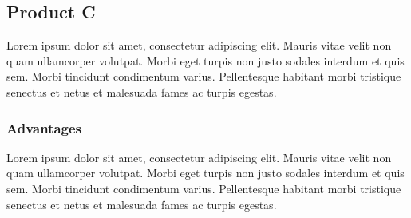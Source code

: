 \documentclass[11pt,a4paper,titlepage]{article}
\begin{document}
\subsection{Product C}
Lorem ipsum dolor sit amet, consectetur adipiscing elit. Mauris vitae velit 
non quam ullamcorper volutpat. Morbi eget turpis non justo sodales interdum 
et quis sem. Morbi tincidunt condimentum varius. Pellentesque habitant morbi 
tristique senectus et netus et malesuada fames ac turpis egestas.\newline
\subsubsection{Advantages}
Lorem ipsum dolor sit amet, consectetur adipiscing elit. Mauris vitae velit 
non quam ullamcorper volutpat. Morbi eget turpis non justo sodales interdum 
et quis sem. Morbi tincidunt condimentum varius. Pellentesque habitant morbi 
tristique senectus et netus et malesuada fames ac turpis egestas.\newline
\end{document}
